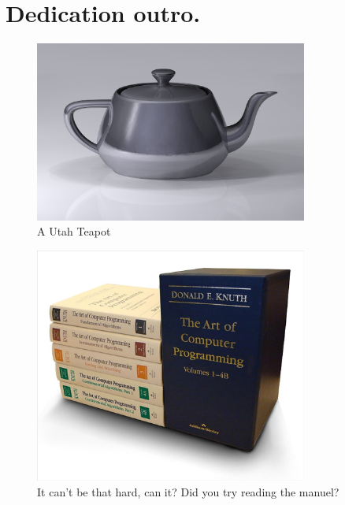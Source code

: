 \documentclass[12pt]{book}
\begin{document}
\appendix

\clearpage
\chapter{Dedication outro.}


\begin{figure}
    \centering
    \includegraphics[width=0.8\textwidth]{figures/utah.png}
    \caption{A Utah Teapot \cite{teapot}}
\end{figure}

\begin{figure}
    \centering
    \includegraphics[width=0.8\textwidth]{figures/aocp.jpg}
    \caption{It can't be that hard, can it? Did you try reading the manuel? \cite{eulerarchive}}
\end{figure}
\end{document}
